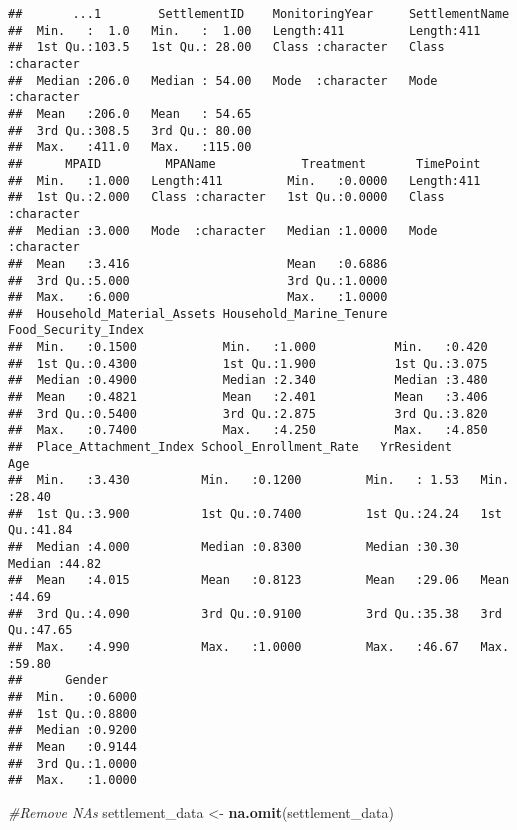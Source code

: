 \documentclass[
]{article}
\newenvironment{Shaded}{\begin{snugshade}}{\end{snugshade}}
\newcommand{\CommentTok}[1]{\textcolor[rgb]{0.56,0.35,0.01}{\textit{#1}}}
\newcommand{\FunctionTok}[1]{\textcolor[rgb]{0.13,0.29,0.53}{\textbf{#1}}}
\newcommand{\NormalTok}[1]{#1}
\newcommand{\OtherTok}[1]{\textcolor[rgb]{0.56,0.35,0.01}{#1}}
\begin{document}
\begin{verbatim}
##       ...1        SettlementID    MonitoringYear     SettlementName    
##  Min.   :  1.0   Min.   :  1.00   Length:411         Length:411        
##  1st Qu.:103.5   1st Qu.: 28.00   Class :character   Class :character  
##  Median :206.0   Median : 54.00   Mode  :character   Mode  :character  
##  Mean   :206.0   Mean   : 54.65                                        
##  3rd Qu.:308.5   3rd Qu.: 80.00                                        
##  Max.   :411.0   Max.   :115.00                                        
##      MPAID         MPAName            Treatment       TimePoint        
##  Min.   :1.000   Length:411         Min.   :0.0000   Length:411        
##  1st Qu.:2.000   Class :character   1st Qu.:0.0000   Class :character  
##  Median :3.000   Mode  :character   Median :1.0000   Mode  :character  
##  Mean   :3.416                      Mean   :0.6886                     
##  3rd Qu.:5.000                      3rd Qu.:1.0000                     
##  Max.   :6.000                      Max.   :1.0000                     
##  Household_Material_Assets Household_Marine_Tenure Food_Security_Index
##  Min.   :0.1500            Min.   :1.000           Min.   :0.420      
##  1st Qu.:0.4300            1st Qu.:1.900           1st Qu.:3.075      
##  Median :0.4900            Median :2.340           Median :3.480      
##  Mean   :0.4821            Mean   :2.401           Mean   :3.406      
##  3rd Qu.:0.5400            3rd Qu.:2.875           3rd Qu.:3.820      
##  Max.   :0.7400            Max.   :4.250           Max.   :4.850      
##  Place_Attachment_Index School_Enrollment_Rate   YrResident         Age       
##  Min.   :3.430          Min.   :0.1200         Min.   : 1.53   Min.   :28.40  
##  1st Qu.:3.900          1st Qu.:0.7400         1st Qu.:24.24   1st Qu.:41.84  
##  Median :4.000          Median :0.8300         Median :30.30   Median :44.82  
##  Mean   :4.015          Mean   :0.8123         Mean   :29.06   Mean   :44.69  
##  3rd Qu.:4.090          3rd Qu.:0.9100         3rd Qu.:35.38   3rd Qu.:47.65  
##  Max.   :4.990          Max.   :1.0000         Max.   :46.67   Max.   :59.80  
##      Gender      
##  Min.   :0.6000  
##  1st Qu.:0.8800  
##  Median :0.9200  
##  Mean   :0.9144  
##  3rd Qu.:1.0000  
##  Max.   :1.0000
\end{verbatim}

\begin{Shaded}
\begin{Highlighting}[]
\CommentTok{\#Remove NAs}
\NormalTok{settlement\_data }\OtherTok{\textless{}{-}} \FunctionTok{na.omit}\NormalTok{(settlement\_data)}
\end{Highlighting}
\end{Shaded}
\end{document}
